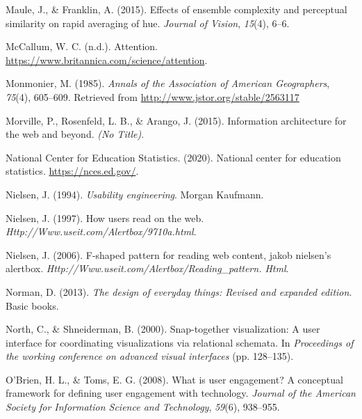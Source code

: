 \documentclass[print]{nuthesis}
\newlength{\cslhangindent}
\newenvironment{CSLReferences}[2]%
{\setlength{\parindent}{0pt}%
\everypar{\setlength{\hangindent}{\cslhangindent}}\ignorespaces}%
{\par}
\begin{document}
\begin{CSLReferences}{1}{0}
\leavevmode{}%
Maule, J., \& Franklin, A. (2015). Effects of ensemble complexity and perceptual similarity on rapid averaging of hue. \emph{Journal of Vision}, \emph{15}(4), 6--6.

\leavevmode{}%
McCallum, W. C. (n.d.). Attention. \url{https://www.britannica.com/science/attention}.

\leavevmode{}%
Monmonier, M. (1985). \emph{Annals of the Association of American Geographers}, \emph{75}(4), 605--609. Retrieved from \url{http://www.jstor.org/stable/2563117}

\leavevmode{}%
Morville, P., Rosenfeld, L. B., \& Arango, J. (2015). Information architecture for the web and beyond. \emph{(No Title)}.

\leavevmode{}%
National Center for Education Statistics. (2020). National center for education statistics. \url{https://nces.ed.gov/}.

\leavevmode{}%
Nielsen, J. (1994). \emph{Usability engineering}. Morgan Kaufmann.

\leavevmode{}%
Nielsen, J. (1997). How users read on the web. \emph{Http://Www.useit.com/Alertbox/9710a.html}.

\leavevmode{}%
Nielsen, J. (2006). F-shaped pattern for reading web content, jakob nielsen's alertbox. \emph{Http://Www.useit.com/Alertbox/Reading\_pattern. Html}.

\leavevmode{}%
Norman, D. (2013). \emph{The design of everyday things: Revised and expanded edition}. Basic books.

\leavevmode{}%
North, C., \& Shneiderman, B. (2000). Snap-together visualization: A user interface for coordinating visualizations via relational schemata. In \emph{Proceedings of the working conference on advanced visual interfaces} (pp. 128--135).

\leavevmode{}%
O'Brien, H. L., \& Toms, E. G. (2008). What is user engagement? A conceptual framework for defining user engagement with technology. \emph{Journal of the American Society for Information Science and Technology}, \emph{59}(6), 938--955.


\end{CSLReferences}
\end{document}
